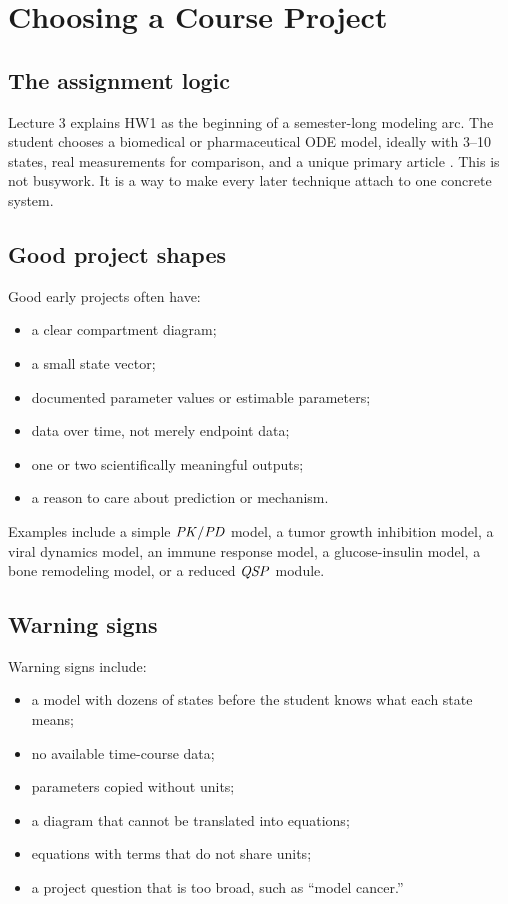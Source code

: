 \documentclass[a4paper]{article}
\newcommand{\PKPD}{\ensuremath{\pksym{PK}/\pksym{PD}}}
\newcommand{\QSP}{\ensuremath{\pksym{QSP}}}
\begin{document}
\section{Choosing a Course Project}

\subsection{The assignment logic}

Lecture 3 explains HW1 as the beginning of a semester-long modeling arc. The student chooses a biomedical or pharmaceutical ODE model, ideally with 3--10 states, real measurements for comparison, and a unique primary article \cite{bmeg671Lecture2Slides2025,bmeg671TranscriptSep032025}. This is not busywork. It is a way to make every later technique attach to one concrete system.

\subsection{Good project shapes}

Good early projects often have:
\begin{itemize}[leftmargin=2em]
  \item a clear compartment diagram;
  \item a small state vector;
  \item documented parameter values or estimable parameters;
  \item data over time, not merely endpoint data;
  \item one or two scientifically meaningful outputs;
  \item a reason to care about prediction or mechanism.
\end{itemize}

Examples include a simple \PKPD{} model, a tumor growth inhibition model, a viral dynamics model, an immune response model, a glucose-insulin model, a bone remodeling model, or a reduced \QSP{} module.

\subsection{Warning signs}

Warning signs include:
\begin{itemize}[leftmargin=2em]
  \item a model with dozens of states before the student knows what each state means;
  \item no available time-course data;
  \item parameters copied without units;
  \item a diagram that cannot be translated into equations;
  \item equations with terms that do not share units;
  \item a project question that is too broad, such as ``model cancer.''
\end{itemize}
\end{document}

